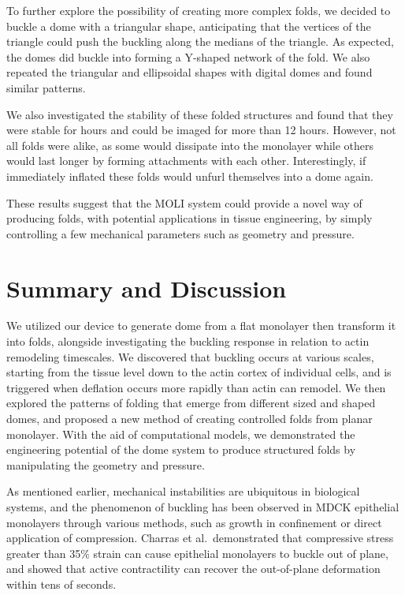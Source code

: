 To further explore the possibility of creating more complex folds, we
decided to buckle a dome with a triangular shape, anticipating that the
vertices of the triangle could push the buckling along the medians of
the triangle. As expected, the domes did buckle into forming a Y-shaped
network of the fold. We also repeated the triangular and ellipsoidal
shapes with digital domes and found similar patterns.

We also investigated the stability of these folded structures and found
that they were stable for hours and could be imaged for more than 12
hours. However, not all folds were alike, as some would dissipate into
the monolayer while others would last longer by forming attachments with
each other. Interestingly, if immediately inflated these folds would
unfurl themselves into a dome again.

These results suggest that the MOLI system could provide a novel way of
producing folds, with potential applications in tissue engineering, by
simply controlling a few mechanical parameters such as geometry and
pressure.

\hypertarget{summary-and-discussion-1}{%
	\section{Summary and Discussion}\label{summary-and-discussion-1}}

We utilized our device to generate dome from a flat monolayer then
transform it into folds, alongside investigating the buckling response
in relation to actin remodeling timescales. We discovered that buckling
occurs at various scales, starting from the tissue level down to the
actin cortex of individual cells, and is triggered when deflation occurs
more rapidly than actin can remodel. We then explored the patterns of
folding that emerge from different sized and shaped domes, and proposed
a new method of creating controlled folds from planar monolayer. With
the aid of computational models, we demonstrated the engineering
potential of the dome system to produce structured folds by manipulating
the geometry and pressure.

As mentioned earlier, mechanical instabilities are ubiquitous in
biological systems, and the phenomenon of buckling has been observed in
MDCK epithelial monolayers through various methods, such as growth in
confinement or direct application of compression. Charras et
al.~demonstrated that compressive stress greater than 35\% strain can
cause epithelial monolayers to buckle out of plane, and showed that
active contractility can recover the out-of-plane deformation within
tens of seconds.

